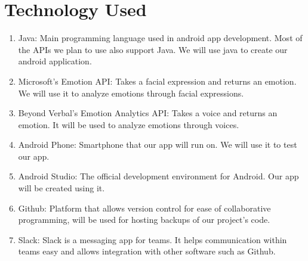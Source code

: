 \chapter{Technology Used}
\begin{enumerate}
\item Java: Main programming language used in android app development. Most of the APIs we plan to use also support Java. We will use java to create our android application.

\item Microsoft’s Emotion API: Takes a facial expression and returns an emotion. We will use it to analyze emotions through facial expressions. 

\item Beyond Verbal’s Emotion Analytics API: Takes a voice and returns an emotion. It will be used to analyze emotions through voices.

\item Android Phone: Smartphone that our app will run on. We will use it to test our app.

\item Android Studio: The official development environment for Android. Our app will be created using it.

\item Github: Platform that allows version control for ease of collaborative programming, will be used for hosting backups of our project's code.

\item Slack: Slack is a messaging app for teams. It helps communication within teams easy and allows integration with other software such as Github. 
\end{enumerate}